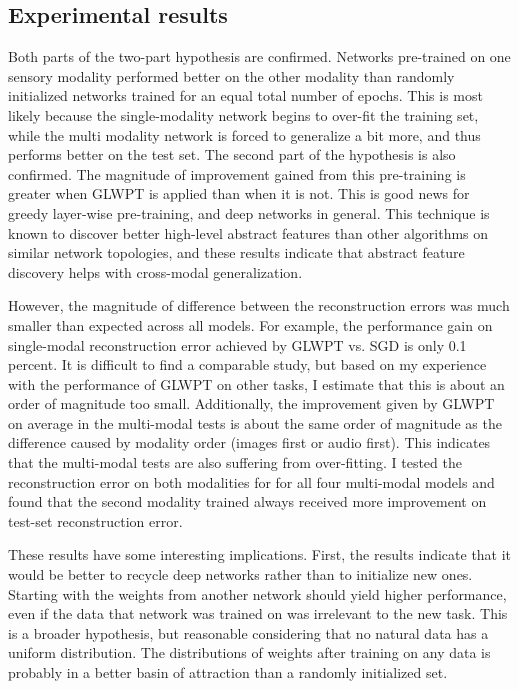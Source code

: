 \documentclass[12pt]{article}
\begin{document}
\begin{doublespacing}
	\subsection{Experimental results}
	Both parts of the two-part hypothesis are confirmed. Networks pre-trained on one sensory modality performed better on the other modality than randomly initialized networks trained for an equal total number of epochs. This is most likely because the single-modality network begins to over-fit the training set, while the multi modality network is forced to generalize a bit more, and thus performs better on the test set. The second part of the hypothesis is also confirmed. The magnitude of improvement gained from this pre-training is greater when GLWPT is applied than when it is not. This is good news for greedy layer-wise pre-training, and deep networks in general. This technique is known to discover better high-level abstract features than other algorithms on similar network topologies, and these results indicate that abstract feature discovery helps with cross-modal generalization. 
		
	However, the magnitude of difference between the reconstruction errors was much smaller than expected across all models. For example, the performance gain on single-modal reconstruction error achieved by GLWPT vs. SGD is only 0.1 percent. It is difficult to find a comparable study, but based on my experience with the performance of GLWPT on other tasks, I estimate that this is about an order of magnitude too small. Additionally, the improvement given by GLWPT on average in the multi-modal tests is about the same order of magnitude as the difference caused by modality order (images first or audio first). This indicates that the multi-modal tests are also suffering from over-fitting. I tested the reconstruction error on both modalities for for all four multi-modal models and found that the second modality trained always received more improvement on test-set reconstruction error. 
		
	These results have some interesting implications. First, the results indicate that it would be better to recycle deep networks rather than to initialize new ones. Starting with the weights from another network should yield higher performance, even if the data that network was trained on was irrelevant to the new task. This is a broader hypothesis, but reasonable considering that no natural data has a uniform distribution. The distributions of weights after training on any data is probably in a better basin of attraction than a randomly initialized set.\
	

\end{doublespacing}
\end{document}
